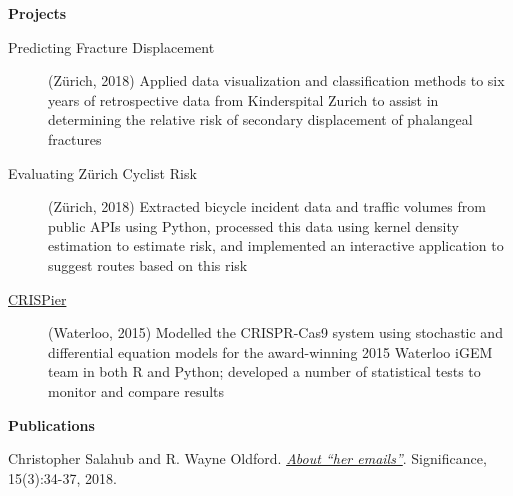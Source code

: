 \documentclass[letterpaper,10pt]{article}
\makeatletter
\newcommand{\resheading}[1]{\colorbox{resBlue}{\begin{minipage}{\textwidth}
			\textbf{#1}
\end{minipage}} \vspace{-14pt}}
\newcommand{\resitem}[4]{\begin{tabular*}{17.5cm}{l@{\extracolsep{\fill}}r} \textbf{#1} & #2 \\ \textit{#3} & \textit{#4} \\ \end{tabular*} \vspace{-6pt}}
\makeatother
\begin{document}
\begin{itemize}
\begin{comment}
			\end{description}}
\item
	\resitem{\href{https://www.calgarystampede.com/}{The Calgary Stampede}}{Calgary, AB}{Parking Attendant}{July 2011, July 2012}
		{\footnotesize \begin{description}
				\item[Teamwork] Managed parking at a surface lot with a team during the annual Calgary Exhibition and Stampede
				\item[Customer Service] Engaged positively with customers and other employees, garnering the Golden Pylon Award for excellence in customer service both years employed
			\end{description}}
\end{comment}
\end{itemize}

\resheading{Projects}
\begin{description}\item[Predicting Fracture Displacement] (Z\"urich, 2018) {\footnotesize Applied data visualization and classification methods to six years of retrospective data from Kinderspital Zurich to assist in determining the relative risk of secondary displacement of phalangeal fractures}
\item[Evaluating Z\"urich Cyclist Risk] (Z\"urich, 2018) {\footnotesize Extracted bicycle incident data and traffic volumes from public APIs using Python, processed this data using kernel density estimation to estimate risk, and implemented an interactive application to suggest routes based on this risk}
\item[\href{http://2015.igem.org/Team:Waterloo}{CRISPier}] (Waterloo, 2015) {\footnotesize Modelled the CRISPR-Cas9 system using stochastic and differential equation models for the award-winning 2015 Waterloo iGEM team in both R and Python; developed a number of statistical tests to monitor and compare results}
\end{description}

\resheading{Publications}
\begin{description}
	\item
	Christopher Salahub and R. Wayne Oldford. \href{https://rss.onlinelibrary.wiley.com/doi/full/10.1111/j.1740-9713.2018.01148.x}{\textit{About ``her emails''}}. Significance, 15(3):34-37, 2018. 
\end{description}
\end{document}
